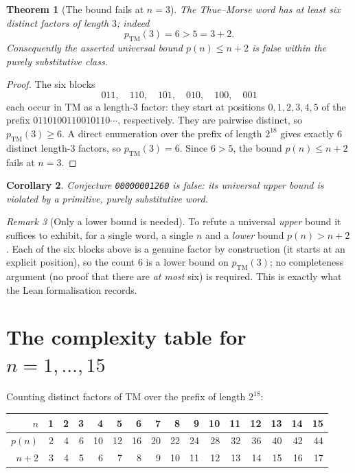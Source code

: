 \documentclass[11pt]{article}
\newtheorem{theorem}{Theorem}
\newtheorem{corollary}[theorem]{Corollary}
\theoremstyle{definition}
\theoremstyle{remark}
\newtheorem{remark}[theorem]{Remark}
\newcommand{\TM}{\mathrm{TM}}
\begin{document}
\begin{theorem}[The bound fails at $n=3$]\label{thm:main}
The Thue--Morse word has at least six distinct factors of length $3$; indeed
\[
p_{\TM}(3) = 6 > 5 = 3 + 2 .
\]
Consequently the asserted universal bound $p(n) \le n+2$ is false within the
purely substitutive class.
\end{theorem}

\begin{proof}
The six blocks
\[
011,\quad 110,\quad 101,\quad 010,\quad 100,\quad 001
\]
each occur in $\TM$ as a length-$3$ factor: they start at positions
$0,1,2,3,4,5$ of the prefix $0110100110010110\cdots$, respectively. They are
pairwise distinct, so $p_{\TM}(3) \ge 6$. A direct enumeration over the prefix
of length $2^{18}$ gives exactly $6$ distinct length-$3$ factors, so
$p_{\TM}(3)=6$. Since $6 > 5$, the bound $p(n) \le n+2$ fails at $n=3$.
\end{proof}

\begin{corollary}
Conjecture \texttt{00000001260} is false: its universal upper bound is
violated by a primitive, purely substitutive word.
\end{corollary}

\begin{remark}[Only a lower bound is needed]
To refute a universal \emph{upper} bound it suffices to exhibit, for a single
word, a single $n$ and a \emph{lower} bound $p(n) > n+2$. Each of the six
blocks above is a genuine factor by construction (it starts at an explicit
position), so the count $6$ is a lower bound on $p_{\TM}(3)$; no completeness
argument (no proof that there are \emph{at most} six) is required. This is
exactly what the Lean formalisation records.
\end{remark}

\section{The complexity table for $n = 1,\dots,15$}

Counting distinct factors of $\TM$ over the prefix of length $2^{18}$:

\begin{center}
\begin{tabular}{rrrrrrrrrrrrrrrr}
\toprule
$n$   & 1 & 2 & 3 & 4  & 5  & 6  & 7  & 8  & 9  & 10 & 11 & 12 & 13 & 14 & 15\\
\midrule
$p(n)$ & 2 & 4 & 6 & 10 & 12 & 16 & 20 & 22 & 24 & 28 & 32 & 36 & 40 & 42 & 44\\
$n+2$  & 3 & 4 & 5 & 6  & 7  & 8  & 9  & 10 & 11 & 12 & 13 & 14 & 15 & 16 & 17\\
\bottomrule
\end{tabular}
\end{center}
\end{document}
